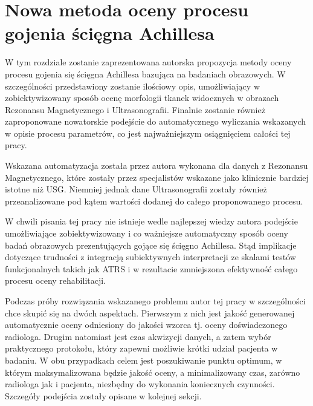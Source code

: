 \chapter{Nowa metoda oceny procesu gojenia ścięgna Achillesa}
\label{NewMethod}




W tym rozdziale zostanie zaprezentowana autorska propozycja metody oceny procesu gojenia się ścięgna Achillesa bazująca na badaniach obrazowych. W szczególności przedstawiony zostanie ilościowy opis, umożliwiający w zobiektywizowany sposób ocenę morfologii tkanek widocznych w obrazach Rezonansu Magnetycznego i Ultrasonografii. Finalnie zostanie również zaproponowane nowatorskie podejście do automatycznego wyliczania wskazanych w opisie procesu parametrów, co jest najważniejszym osiągnięciem całości tej pracy. 

Wskazana automatyzacja została przez autora wykonana dla danych z Rezonansu Magnetycznego, które zostały przez specjalistów wskazane jako klinicznie bardziej istotne niż USG. Niemniej jednak dane Ultrasonografii zostały również przeanalizowane pod kątem wartości dodanej do całego proponowanego procesu.  

W chwili pisania tej pracy nie istnieje wedle najlepszej wiedzy autora podejście umożliwiające zobiektywizowany i co ważniejsze automatyczny sposób oceny badań obrazowych prezentujących gojące się ścięgno Achillesa. Stąd implikacje dotyczące trudności z integracją subiektywnych interpretacji ze skalami testów funkcjonalnych takich jak ATRS i w rezultacie zmniejszona efektywność całego procesu oceny rehabilitacji. 

Podczas próby rozwiązania wskazanego problemu autor tej pracy w szczególności chce skupić się na dwóch aspektach. Pierwszym z nich jest jakość generowanej automatycznie oceny odniesiony do jakości wzorca tj. oceny doświadczonego radiologa. Drugim natomiast jest czas akwizycji danych, a zatem wybór praktycznego protokołu, który zapewni możliwie krótki udział pacjenta w badaniu. W obu przypadkach celem jest poszukiwanie punktu optimum, w którym maksymalizowana będzie jakość oceny, a minimalizowany czas, zarówno radiologa jak i pacjenta, niezbędny do wykonania koniecznych czynności. Szczegóły podejścia zostały opisane w kolejnej sekcji.


